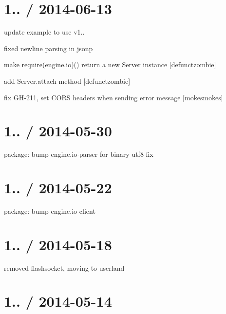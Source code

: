 \section*{1.. / 2014-\/06-\/13 }


\begin{DoxyItemize}
\item update example to use v1..
\item fixed newline parsing in jsonp
\item make require(\textquotesingle{}engine.\+io\textquotesingle{})() return a new Server instance \mbox{[}defunctzombie\mbox{]}
\item add Server.\+attach method \mbox{[}defunctzombie\mbox{]}
\item fix G\+H-\/211, set C\+O\+RS headers when sending error message \mbox{[}mokesmokes\mbox{]}
\end{DoxyItemize}

\section*{1.. / 2014-\/05-\/30 }


\begin{DoxyItemize}
\item package\+: bump {\ttfamily engine.\+io-\/parser} for binary utf8 fix
\end{DoxyItemize}

\section*{1.. / 2014-\/05-\/22 }


\begin{DoxyItemize}
\item package\+: bump engine.\+io-\/client
\end{DoxyItemize}

\section*{1.. / 2014-\/05-\/18 }


\begin{DoxyItemize}
\item removed flashsocket, moving to userland
\end{DoxyItemize}

\section*{1.. / 2014-\/05-\/14 }


